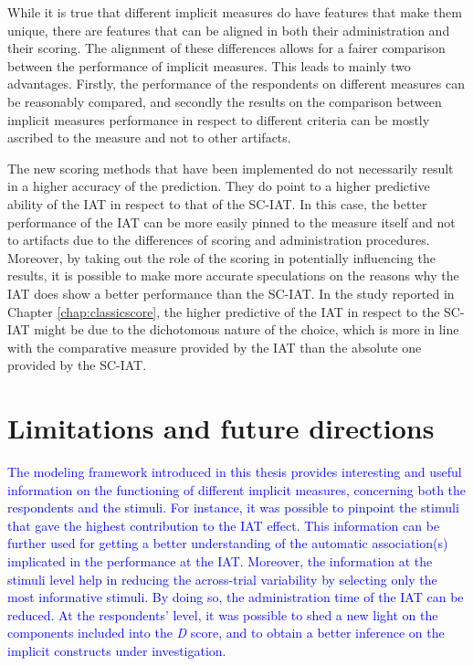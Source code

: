 \documentclass[12pt]{book}
\begin{document}
While it is true that different implicit measures do have features that make them unique, there are features that can be aligned in both their administration and their scoring. 
The alignment of these differences allows for a fairer comparison between the performance of implicit measures. 
This leads to mainly two advantages. Firstly, the performance of the respondents on different measures can be reasonably compared, and secondly the results on the comparison between implicit measures performance in respect to different criteria can be mostly ascribed to the measure and not to other artifacts. 

The new scoring methods that have been implemented do not necessarily result in a higher accuracy of the prediction. They do point to a higher predictive ability of the IAT in respect to that of the SC-IAT. In this case, the better performance of the IAT can be more easily pinned to the measure itself and not to artifacts due to the differences of scoring and administration procedures. Moreover, by taking out the role of the scoring in potentially influencing the results, it is possible to make more accurate speculations on the reasons why the IAT does show a better performance than the SC-IAT.  
In the study reported in Chapter \ref{chap:classicscore}, the higher predictive of the IAT in respect to the SC-IAT might be due to the dichotomous nature of the choice, which is more in line with the comparative measure provided by the IAT than the absolute one provided by the SC-IAT.

\section*{Limitations and future directions}

\textcolor{blue}{The modeling framework introduced in this thesis provides interesting and useful information on the functioning of different implicit measures, concerning both the respondents and the stimuli. 
	For instance, it was possible to pinpoint the stimuli that gave the highest contribution to the IAT effect. This information can be further used for getting a better understanding of the automatic association(s) implicated in the performance at the IAT. 
	Moreover, the information at the stimuli level help in reducing the across-trial variability by selecting only the most informative stimuli. By doing so, the administration time of the IAT can be reduced. 
	At the respondents' level, it was possible to shed a new light on the components included into the \emph{D} score, and to obtain a better inference on the implicit constructs under investigation. 
}
\end{document}
